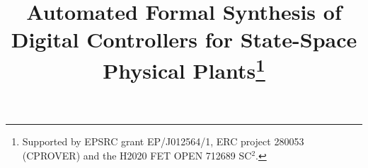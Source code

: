 \documentclass[runningheads,a4paper]{llncs}
\begin{document}
\newcommand\tool{{\sf DSSynth}\xspace}

\mainmatter  %

\title{Automated Formal Synthesis of Digital Controllers for State-Space
Physical Plants\thanks{Supported by EPSRC grant EP/J012564/1, ERC project
280053 (CPROVER) and the H2020 FET OPEN 712689 SC$^2$.}}



%
%
%


%
%

\end{document}
